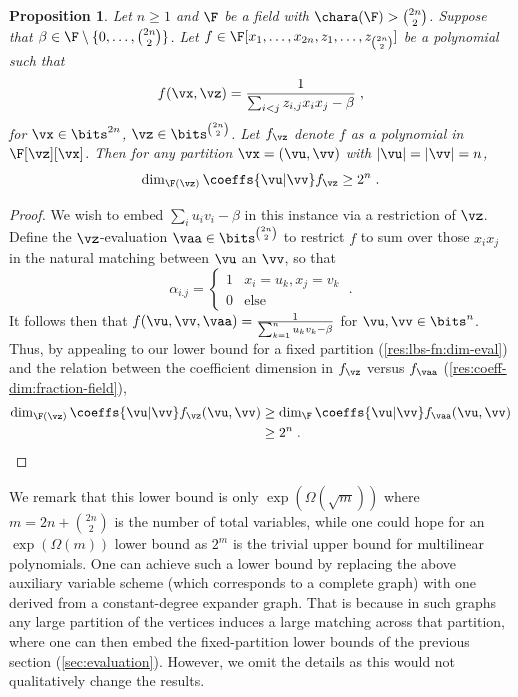 \documentclass[11pt]{article}
\numberwithin{equation}{section}
\newtheorem{proposition}[theorem]{Proposition}
\theoremstyle{definition}
\theoremstyle{plain}
\begin{document}
\begin{proposition}\label{res:lbs-fn:any-order:coeff-dim}
        Let $n\ge 1$ and $\F$ be a field with $\chara(\F)>\binom{2n}{2}$.  Suppose that $\beta\in\F\setminus\{0,\ldots,\binom{2n}{2}\}$.  Let $f\in\F[x_1,\ldots,x_{2n},z_1,\ldots,z_{\binom{2n}{2}}]$ be a polynomial such that
        \[
                f(\vx,\vz)=\frac{1}{\sum_{i<j} z_{i,j}x_ix_j-\beta}
                \;,
        \]
        for $\vx\in\bits^{2n}$, $\vz\in\bits^{\binom{2n}{2}}$. Let $f_\vz$ denote $f$ as a polynomial in $\F[\vz][\vx]$.  Then for any partition $\vx=(\vu,\vv)$ with $|\vu|=|\vv|=n$,
        \[
                \dim_{\F(\vz)}\coeffs{\vu|\vv} f_\vz \ge 2^n
                \;.
        \]
\end{proposition}
\begin{proof}
        We wish to embed $\sum_i u_iv_i-\beta$ in this instance via a restriction of $\vz$. Define the $\vz$-evaluation $\vaa\in\bits^{\binom{2n}{2}}$ to restrict $f$ to sum over those $x_ix_j$ in the natural matching between $\vu$ an $\vv$, so that
        \[
                \alpha_{i.j}
                =\begin{cases}
                        1       &       x_i=u_k, x_j=v_k\\
                        0       &       \text{else}
                \end{cases}
                \;.
        \]
        It follows then that $f(\vu,\vv,\vaa)=\frac{1}{\sum_{k=1}^n u_kv_k-\beta}$ for $\vu,\vv\in\bits^{n}$. Thus, by appealing to our lower bound for a fixed partition (\autoref{res:lbs-fn:dim-eval}) and the relation between the coefficient dimension in $f_\vz$ versus $f_\vaa$ (\autoref{res:coeff-dim:fraction-field}),
        \begin{align*}
                \dim_{\F(\vz)}\coeffs{\vu|\vv} f_\vz(\vu,\vv)
                &\ge \dim_\F \coeffs{\vu|\vv}f_\vaa(\vu,\vv)\\
                &\ge 2^n
                \;.
                \qedhere
        \end{align*}
\end{proof}

We remark that this lower bound is only $\exp(\Omega(\sqrt{m}))$ where $m=2n+\binom{2n}{2}$ is the number of total variables, while one could hope for an $\exp(\Omega(m))$ lower bound as $2^m$ is the trivial upper bound for multilinear polynomials.  One can achieve such a lower bound by replacing the above auxiliary variable scheme (which corresponds to a complete graph) with one derived from a constant-degree expander graph. That is because in such graphs any large partition of the vertices induces a large matching across that partition, where one can then embed the fixed-partition lower bounds of the previous section (\autoref{sec:evaluation}).  However, we omit the details as this would not qualitatively change the results.
%
\end{document}
